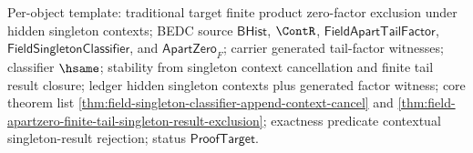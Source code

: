 Per-object template: traditional target finite product zero-factor exclusion
under hidden singleton contexts; BEDC source $\mathsf{BHist}$, $\ContR$,
$\mathsf{FieldApartTailFactor}$, $\mathsf{FieldSingletonClassifier}$, and
$\mathsf{ApartZero}_F$; carrier generated tail-factor witnesses; classifier
$\hsame$; stability from singleton context cancellation and finite tail result
closure; ledger hidden singleton contexts plus generated factor witness; core
theorem list \autoref{thm:field-singleton-classifier-append-context-cancel} and
\autoref{thm:field-apartzero-finite-tail-singleton-result-exclusion};
exactness predicate contextual singleton-result rejection; status
$\mathsf{ProofTarget}$.


